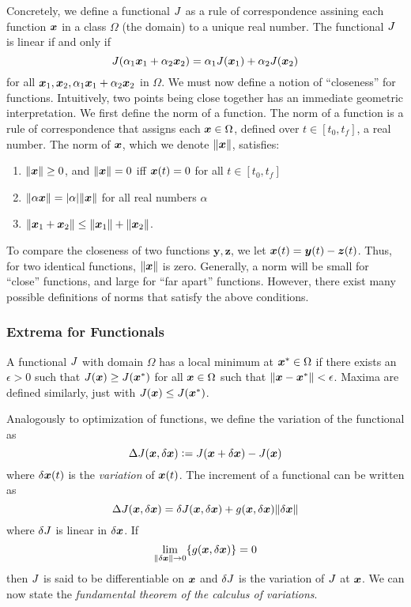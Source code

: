 Concretely, we define a functional $J$ as a rule of correspondence assining each function $\bm{x}$ in a class $\Omega$ (the domain) to a unique real number. The functional $J$ is linear if and only if 
\begin{equation}
    J(\alpha_1 \bm{x}_1 + \alpha_2 \bm{x}_2) = \alpha_1 J(\bm{x}_1) + \alpha_2 J(\bm{x}_2)
\end{equation}
for all $\bm{x}_1, \bm{x}_2, \alpha_1 \bm{x}_1 + \alpha_2 \bm{x}_2$ in $\Omega$. We must now define a notion of ``closeness'' for functions. Intuitively, two points being close together has an immediate geometric interpretation. We first define the norm of a function. The norm of a function is a rule of correspondence that assigns each $\bm{x} \in \Omega$, defined over $t \in [t_0,t_f]$, a real number. The norm of $\bm{x}$, which we denote $\|\bm{x}\|$, satisfies:
\begin{enumerate}
    \item $\|\bm{x}\| \geq 0$, and $\|\bm{x}\|=0$ iff $\bm{x}(t) = 0$ for all $t \in [t_0,t_f]$
    \item $\|\alpha \bm{x}\| = |\alpha| \|\bm{x}\|$ for all real numbers $\alpha$
    \item $\|\bm{x}_1 + \bm{x}_2\| \leq \|\bm{x}_1\| + \|\bm{x}_2\|$.
\end{enumerate}
To compare the closeness of two functions $\bm{y}, \bm{z}$, we let $\bm{x}(t) = \bm{y}(t) - \bm{z}(t)$. Thus, for two identical functions, $\|\bm{x}\|$ is zero. Generally, a norm will be small for ``close'' functions, and large for ``far apart'' functions. However, there exist many possible definitions of norms that satisfy the above conditions. 

\subsubsection{Extrema for Functionals}

A functional $J$ with domain $\Omega$ has a local minimum at $\bm{x}^* \in \Omega$ if there exists an $\epsilon > 0$ such that $J(\bm{x}) \geq J(\bm{x}^*)$ for all $\bm{x} \in \Omega$ such that $\|\bm{x} - \bm{x}^*\| < \epsilon$. Maxima are defined similarly, just with $J(\bm{x}) \leq J(\bm{x}^*)$. 

Analogously to optimization of functions, we define the variation of the functional as
\begin{equation}
    \Delta J(\bm{x},\delta \bm{x}) \vcentcolon= J(\bm{x} + \delta \bm{x}) - J(\bm{x})
\end{equation}
where $\delta \bm{x}(t)$ is the \textit{variation} of $\bm{x}(t)$. The increment of a functional can be written as 
\begin{equation}
    \Delta J(\bm{x},\delta \bm{x}) = \delta J(\bm{x},\delta \bm{x}) + g(\bm{x},\delta \bm{x}) \|\delta \bm{x}\|
\end{equation}
where $\delta J$ is linear in $\delta \bm{x}$. If 
\begin{equation}
    \lim_{\|\delta \bm{x} \| \to 0} \{g(\bm{x},\delta \bm{x})\} = 0
\end{equation}
then $J$ is said to be differentiable on $\bm{x}$ and $\delta J$ is the variation of $J$ at $\bm{x}$. 
We can now state the \textit{fundamental theorem of the calculus of variations}. 

